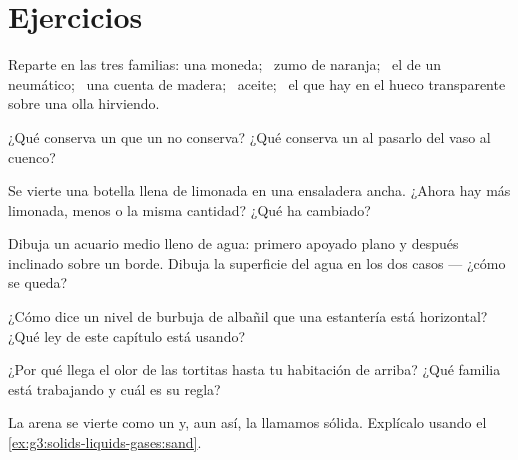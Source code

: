 \section{Ejercicios}

\begin{exercise}[$\star$]\label{exo:g3:solids-liquids-gases:1}
Reparte en las tres familias: una moneda; \ zumo de naranja; \ el
 de un neumático; \ una cuenta de madera; \ aceite; \ el
 que hay en el hueco transparente sobre una olla hirviendo.
\end{exercise}

\begin{exercise}[$\star$]\label{exo:g3:solids-liquids-gases:2}
¿Qué conserva un  que un  no conserva? ¿Qué conserva un
 al pasarlo del vaso al cuenco?
\end{exercise}

\begin{exercise}[$\star$]\label{exo:g3:solids-liquids-gases:3}
Se vierte una botella llena de limonada en una ensaladera ancha.
¿Ahora hay más limonada, menos o la misma cantidad? ¿Qué ha cambiado?
\end{exercise}

\begin{exercise}[$\star$]\label{exo:g3:solids-liquids-gases:4}
Dibuja un acuario medio lleno de agua: primero apoyado plano y después
inclinado sobre un borde. Dibuja la superficie del agua en los dos
casos --- ¿cómo se queda?
\end{exercise}

\begin{exercise}[$\star$]\label{exo:g3:solids-liquids-gases:5}
¿Cómo dice un nivel de burbuja de albañil que una estantería está
horizontal? ¿Qué ley de este capítulo está usando?
\end{exercise}

\begin{exercise}[$\star$]\label{exo:g3:solids-liquids-gases:6}
¿Por qué llega el olor de las tortitas hasta tu habitación de arriba?
¿Qué familia está trabajando y cuál es su regla?
\end{exercise}

\begin{exercise}[$\star$]\label{exo:g3:solids-liquids-gases:7}
La arena se vierte como un  y, aun así, la llamamos
sólida. Explícalo usando el \cref{ex:g3:solids-liquids-gases:sand}.
\end{exercise}

